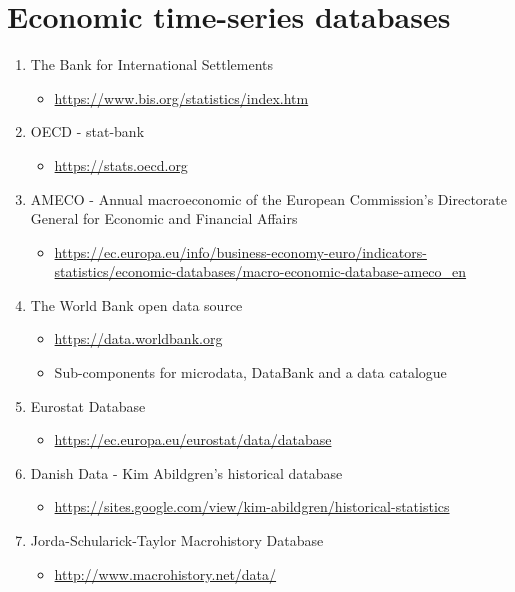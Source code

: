\documentclass[
]{book}
\providecommand{\tightlist}{%
  \setlength{\itemsep}{0pt}\setlength{\parskip}{0pt}}
\begin{document}
\hypertarget{economic-time-series-databases}{%
\section{Economic time-series databases}\label{economic-time-series-databases}}

\begin{enumerate}
\def\labelenumi{\arabic{enumi}.}
\tightlist
\item
  The Bank for International Settlements

  \begin{itemize}
  \tightlist
  \item
    \url{https://www.bis.org/statistics/index.htm}
  \end{itemize}
\item
  OECD - stat-bank

  \begin{itemize}
  \tightlist
  \item
    \url{https://stats.oecd.org}
  \end{itemize}
\item
  AMECO - Annual macroeconomic of the European Commission's Directorate General for Economic and Financial Affairs

  \begin{itemize}
  \tightlist
  \item
    \url{https://ec.europa.eu/info/business-economy-euro/indicators-statistics/economic-databases/macro-economic-database-ameco_en}
  \end{itemize}
\item
  The World Bank open data source

  \begin{itemize}
  \tightlist
  \item
    \url{https://data.worldbank.org}
  \item
    Sub-components for microdata, DataBank and a data catalogue
  \end{itemize}
\item
  Eurostat Database

  \begin{itemize}
  \tightlist
  \item
    \url{https://ec.europa.eu/eurostat/data/database}
  \end{itemize}
\item
  Danish Data - Kim Abildgren's historical database

  \begin{itemize}
  \tightlist
  \item
    \url{https://sites.google.com/view/kim-abildgren/historical-statistics}
  \end{itemize}
\item
  Jorda-Schularick-Taylor Macrohistory Database

  \begin{itemize}
  \tightlist
  \item
    \url{http://www.macrohistory.net/data/}
  \end{itemize}
\end{enumerate}
\end{document}
